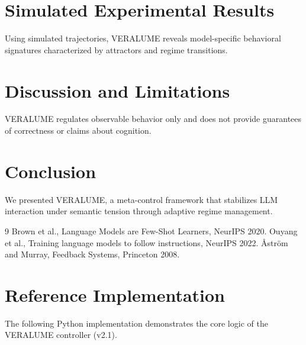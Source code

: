 \documentclass[11pt]{article}
\begin{document}
\section{Simulated Experimental Results}
Using simulated trajectories, VERALUME reveals model-specific behavioral signatures characterized by attractors and regime transitions.

\section{Discussion and Limitations}
VERALUME regulates observable behavior only and does not provide guarantees of correctness or claims about cognition.

\section{Conclusion}
We presented VERALUME, a meta-control framework that stabilizes LLM interaction under semantic tension through adaptive regime management.

\begin{thebibliography}{9}
 Brown et al., Language Models are Few-Shot Learners, NeurIPS 2020.
 Ouyang et al., Training language models to follow instructions, NeurIPS 2022.
 \AA str\"om and Murray, Feedback Systems, Princeton 2008.
\end{thebibliography}

\appendix
\section{Reference Implementation}
The following Python implementation demonstrates the core logic of the VERALUME controller (v2.1).
\end{document}
